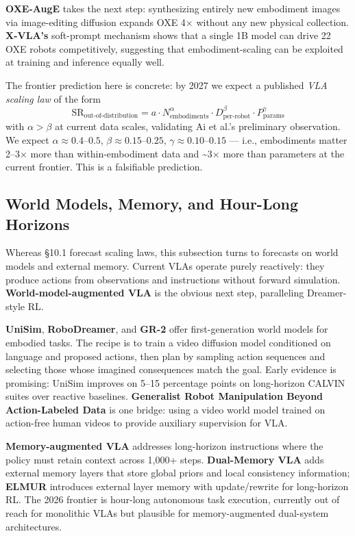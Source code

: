 \documentclass{article}
\begin{document}
\textbf{OXE-AugE} \cite{ji2025oxeaugealargescale} takes the next step: synthesizing entirely new embodiment images via image-editing diffusion expands OXE 4× without any new physical collection. \textbf{X-VLA's} \cite{zheng2025xvlasoftpromptedtr} soft-prompt mechanism shows that a single 1B model can drive 22 OXE robots competitively, suggesting that embodiment-scaling can be exploited at training and inference equally well.

The frontier prediction here is concrete: by 2027 we expect a published \emph{VLA scaling law} of the form
\[\text{SR}_{\text{out-of-distribution}} = a \cdot N_{\text{embodiments}}^{\alpha} \cdot D_{\text{per-robot}}^{\beta} \cdot P_{\text{params}}^{\gamma}\]
with \(\alpha > \beta\) at current data scales, validating Ai et al.'s preliminary observation. We expect \(\alpha \approx 0.4–0.5\), \(\beta \approx 0.15–0.25\), \(\gamma \approx 0.10–0.15\) --- i.e., embodiments matter 2--3× more than within-embodiment data and \textasciitilde3× more than parameters at the current frontier. This is a falsifiable prediction.

\subsection{World Models, Memory, and Hour-Long Horizons}\label{world-models-memory-and-hour-long-horizons}

Whereas §10.1 forecast scaling laws, this subsection turns to forecasts on world models and external memory. Current VLAs operate purely reactively: they produce actions from observations and instructions without forward simulation. \textbf{World-model-augmented VLA} is the obvious next step, paralleling Dreamer-style RL.

\textbf{UniSim}, \textbf{RoboDreamer}, and \textbf{GR-2} offer first-generation world models for embodied tasks. The recipe is to train a video diffusion model conditioned on language and proposed actions, then plan by sampling action sequences and selecting those whose imagined consequences match the goal. Early evidence is promising: UniSim improves on 5--15 percentage points on long-horizon CALVIN suites over reactive baselines. \textbf{Generalist Robot Manipulation Beyond Action-Labeled Data} \cite{spiridonov2025generalistrobotman} is one bridge: using a video world model trained on action-free human videos to provide auxiliary supervision for VLA.

\textbf{Memory-augmented VLA} addresses long-horizon instructions where the policy must retain context across 1,000+ steps. \textbf{Dual-Memory VLA} \cite{li2026globalpriormeetslo} adds external memory layers that store global priors and local consistency information; \textbf{ELMUR} \cite{cherepanov2025elmurexternallayer} introduces external layer memory with update/rewrite for long-horizon RL. The 2026 frontier is hour-long autonomous task execution, currently out of reach for monolithic VLAs but plausible for memory-augmented dual-system architectures.
\end{document}
